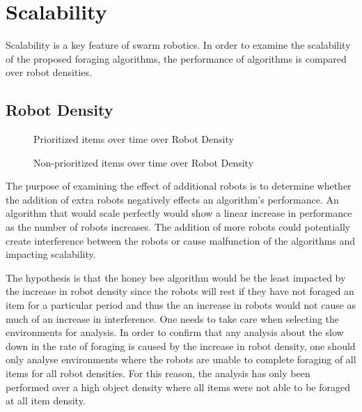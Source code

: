 \section{Scalability}
\label{results:scability}
Scalability is a key feature of swarm robotics. In order to examine the scalability of the proposed foraging algorithms, the performance of algorithms is compared over robot densities. 

\subsection{Robot Density}
\label{results:numberenvironments}


\begin{figure}[!htb]
\centering
\resizebox{\textwidth}{!}{}
\caption{Prioritized items over time over Robot Density}
\label{robotsgoldplot}
\end{figure}

\begin{figure}[!htb]
\centering
\resizebox{\textwidth}{!}{}
\caption{Non-prioritized items over time over Robot Density}
\label{robotswasteplot}
\end{figure}

The purpose of examining the effect of additional robots is to determine whether the addition of extra robots negatively effects an algorithm's performance. An algorithm that would scale perfectly would show a linear increase in performance as the number of robots increases. The addition of more robots could potentially create interference between the robots or cause malfunction of the algorithms and impacting scalability. 

The hypothesis is that the honey bee algorithm would be the least impacted by the increase in robot density since the robots will rest if they have not foraged an item for a particular period and thus the an increase in robots would not cause as much of an increase in interference. One needs to take care when selecting the environments for analysis. In order to confirm that any analysis about the slow down in the rate of foraging is caused by the increase in robot density, one should only analyse environments where the robots are unable to complete foraging of all items for all robot densities. For this reason, the analysis has only been performed over a high object density where all items were not able to be foraged at all item density. 

